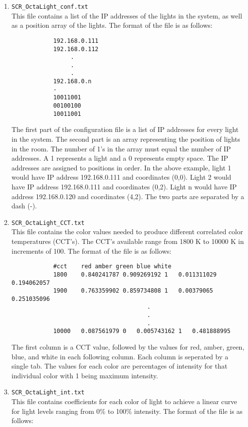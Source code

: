 \documentclass[twoside]{article}
\begin{document}
	\begin{enumerate}
		\item \verb|SCR_OctaLight_conf.txt|\\
		This file contains a list of the IP addresses of the lights in the system, as well as a position array of the lights. The format of the file is as follows:
		
		\begin{verbatim}
		    192.168.0.111
		    192.168.0.112
		         .
		         .
		         .
		    192.168.0.n
		    -
		    10011001
		    00100100
		    10011001
		\end{verbatim}
		
		The first part of the configuration file is a list of IP addresses for every light in the system. The second part is an array representing the position of lights in the room. The number of 1's in the array must equal the number of IP addresses. A 1 represents a light and a 0 represents empty space. The IP addresses are assigned to positions in order. In the above example, light 1 would have IP address 192.168.0.111 and coordinates (0,0). Light 2 would have IP address 192.168.0.111 and coordinates (0,2). Light n would have IP address 192.168.0.120 and coordinates (4,2). The two parts are separated by a dash (-). 
		
		\item \verb|SCR_OctaLight_CCT.txt|\\
		This file contains the color values needed to produce different correlated color temperatures (CCT's). The CCT's available range from 1800 K to 10000 K in increments of 100. The format of the file is as follows:
		
		\begin{verbatim}
		    #cct    red amber green blue white
		    1800	0.840241787	0.909269192	1	0.011311029	0.194062057
		    1900	0.763359902	0.859734808	1	0.00379065	0.251035096
			                           .
			                           .
			                           .
		    10000	0.087561979	0	0.005743162	1	0.481888995
		\end{verbatim}
		
		The first column is a CCT value, followed by the values for red, amber, green, blue, and 
		white in each following column. Each column is seperated by a single tab. The values for each color are percentages of intensity for that individual color with 1 being maximum intensity.
		
		\item \verb|SCR_OctaLight_int.txt|\\
		This file contains coefficients for each color of light to achieve a linear curve for light levels ranging from 0\% to 100\% intensity. The format of the file is as follows:
		

\end{enumerate}
\end{document}
